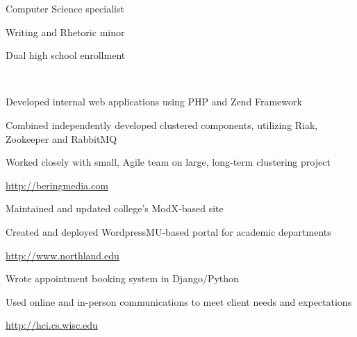 \documentclass[letterpaper,11pt,notitlepage]{article}
\begin{document}

\vbar
{}
    \begin{employment}
        \item Computer Science specialist
        \item Writing and Rhetoric minor
    \end{employment}
    \begin{employment}
        \item Dual high school enrollment
    \end{employment}

\vbar
{}
         \\
        \begin{employment}
            \item Developed internal web applications using PHP and Zend 
            Framework
            \item Combined independently developed clustered components, 
            utilizing Riak, Zookeeper and RabbitMQ 
            \item Worked closely with small, Agile team on large, long-term 
            clustering project 
            \item \url{http://beringmedia.com}
        \end{employment}
        \begin{employment}
            \item Maintained and updated college's ModX-based site
            \item Created and deployed WordpressMU-based portal for academic
            departments 
            \item \url{http://www.northland.edu}
        \end{employment}
        \begin{employment}
            \item Wrote appointment booking system in Django/Python 
            \item Used online and in-person communications to meet client needs
            and expectations
            \item \url{http://hci.cs.wisc.edu}
        \end{employment}
\end{document}
